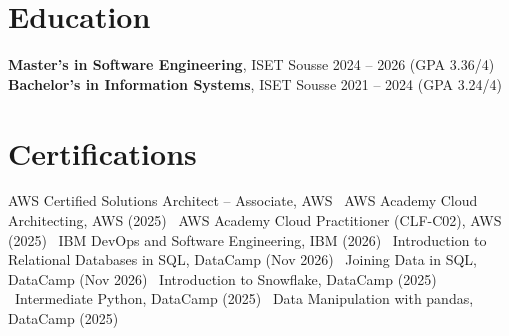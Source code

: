 \documentclass[a4paper,10pt]{article}
\begin{document}
\section*{Education}
\textbf{Master's in Software Engineering}, ISET Sousse \hfill 2024 -- 2026 (GPA 3.36/4)\\
\textbf{Bachelor's in Information Systems}, ISET Sousse \hfill 2021 -- 2024 (GPA 3.24/4)

\section*{Certifications}
AWS Certified Solutions Architect -- Associate, AWS \textbar\ AWS Academy Cloud Architecting, AWS (2025) \textbar\ AWS Academy Cloud Practitioner (CLF-C02), AWS (2025) \textbar\ IBM DevOps and Software Engineering, IBM (2026) \textbar\ Introduction to Relational Databases in SQL, DataCamp (Nov 2026) \textbar\ Joining Data in SQL, DataCamp (Nov 2026) \textbar\ Introduction to Snowflake, DataCamp (2025) \textbar\ Intermediate Python, DataCamp (2025) \textbar\ Data Manipulation with pandas, DataCamp (2025)
\end{document}
